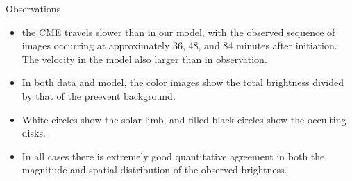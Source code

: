 \documentclass{beamer}
\begin{document}
\begin{frame}{Observations}
\begin{itemize}
\item the CME travels slower than in our model, with
the observed sequence of images occurring at approximately 36,
48, and 84 minutes after initiation. The velocity in the model also larger than in observation.
\item In both data and model, the
color images show the total brightness divided by that of the preevent
background.  
\item White circles show the solar limb, and filled
black circles show the occulting disks.
\item In all cases there is  extremely
good quantitative agreement in both the magnitude and spatial distribution
of the observed brightness.
\end{itemize}
\end{frame}
\end{document}
